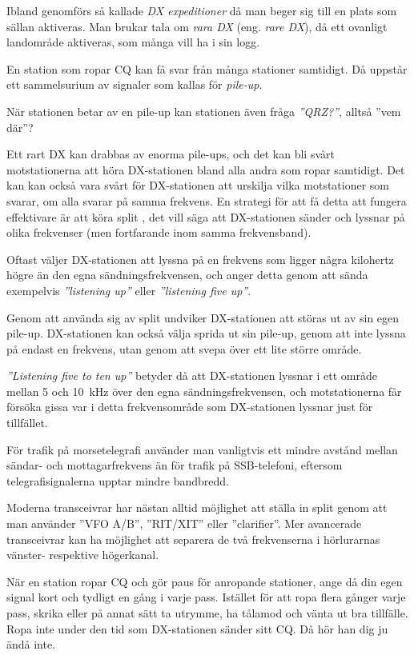 Ibland genomförs så kallade \emph{DX expeditioner} då man beger sig till en
plats som sällan aktiveras.
Man brukar tala om \emph{rara DX} (eng. \emph{rare DX}), då ett ovanligt
landområde aktiveras, som många vill ha i sin logg.

En station som ropar CQ kan få svar från många stationer samtidigt.
Då uppstår ett sammelsurium av signaler som kallas för \emph{pile-up}.

När stationen betar av en pile-up kan stationen även fråga \emph{''QRZ?''}, alltså ''vem där''?

Ett rart DX kan drabbas av enorma pile-ups, och det kan bli svårt
motstationerna att höra DX-stationen bland alla andra som ropar samtidigt.
Det kan kan också vara svårt för DX-stationen att urskilja vilka motstationer
som svarar, om alla svarar på samma frekvens.
En strategi för att få detta att fungera effektivare är att köra split
\cite{LowBandDX}, det vill säga att DX-stationen sänder och lyssnar på olika
frekvenser (men fortfarande inom samma frekvensband).

Oftast väljer DX-stationen att lyssna på en frekvens som ligger några kilohertz
högre än den egna sändningsfrekvensen, och anger detta genom att sända
exempelvis \emph{''listening up''} eller \emph{''listening five up''}.

Genom att använda sig av split undviker DX-stationen att störas ut av sin egen
pile-up.
DX-stationen kan också välja sprida ut sin pile-up, genom att inte lyssna på
endast en frekvens, utan genom att svepa över ett lite större område.

\emph{''Listening five to ten up''} betyder då att DX-stationen lyssnar i ett
område mellan 5 och 10~kHz över den egna sändningsfrekvensen, och
motstationerna får försöka gissa var i detta frekvensområde som DX-stationen
lyssnar just för tillfället.

För trafik på morsetelegrafi använder man vanligtvis ett mindre avstånd mellan
sändar- och mottagarfrekvens än för trafik på SSB-telefoni, eftersom
telegrafisignalerna upptar mindre bandbredd.

Moderna transceivrar har nästan alltid möjlighet att ställa in split genom att
man använder ''VFO A/B'', ''RIT/XIT'' eller ''clarifier''.
Mer avancerade transceivrar kan ha möjlighet att separera de två frekvenserna i
hörlurarnas vänster- respektive högerkanal.

När en station ropar CQ och gör paus för anropande stationer, ange då din egen
signal kort och tydligt en gång i varje pass.
Istället för att ropa flera gånger varje pass, skrika eller på annat sätt
ta utrymme, ha tålamod och vänta ut bra tillfälle.
Ropa inte under den tid som DX-stationen sänder sitt CQ. Då hör han dig ju ändå inte.

